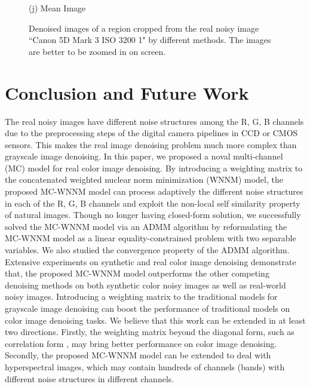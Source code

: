 \documentclass[10pt,twocolumn,letterpaper,sort&compress]{article}
\begin{document}
\begin{figure}
{\begin{minipage}[t]{0.195\textwidth}
{\footnotesize (j) Mean Image}
\end{minipage}
}\vspace{-0.5mm}
\caption{Denoised images of a region cropped from the real noisy image ``Canon 5D Mark 3 ISO 3200 1" \cite{crosschannel2016} by different methods. The images are better to be zoomed in on screen.}
\label{f4}
\vspace{0mm}
\end{figure}

\section{Conclusion and Future Work}

The real noisy images have different noise structures among the R, G, B channels due to the preprocessing steps of the digital camera pipelines in CCD or CMOS sensors. This makes the real image denoising problem much more complex than grayscale image denoising. In this paper, we proposed a noval multi-channel (MC) model for real color image denoising. By introducing a weighting matrix to the concatenated weighted nuclear norm minimization (WNNM) model, the proposed MC-WNNM model can process adaptively the different noise structures in each of the R, G, B channels and exploit the non-local self similarity property of natural images. Though no longer having closed-form solution, we successfully solved the MC-WNNM model via an ADMM algorithm by reformulating the MC-WNNM model as a linear equality-constrained problem with two separable variables. We also studied the convergence property of the ADMM algorithm. Extensive experiments on synthetic and real color image denoising demonstrate that, the proposed MC-WNNM model outperforms the other competing denoising methods on both synthetic color noisy images as well as real-world noisy images. Introducing a weighting matrix to the traditional models for grayscale image denoising can boost the performance of traditional models on color image denoising tasks. We believe that this work can be extended in at least two directions. Firstly, the weighting matrix beyond the diagonal form, such as correlation form \cite{nearcor}, may bring better performance on color image denoising. Secondly, the proposed MC-WNNM model can be extended to deal with hyperspectral images, which may contain hundreds of channels (bands) with different noise structures in different channels.


{
\small


}
\end{document}
